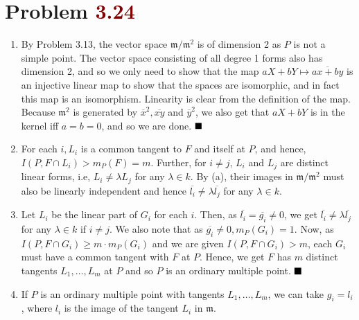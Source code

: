 \documentclass[12pt]{article}
\begin{document}
\section{Problem \textcolor{maroon}{3.24}} %
\begin{enumerate}[label = (\alph*)]
    \item By Problem 3.13, the vector space \( \mathfrak{m}/\mathfrak{m}^2 \) is of dimension 2 as \( P \) is not a simple point. The vector space consisting of all degree 1 forms also has dimension 2, and so we only need to show that the map \( aX+bY \mapsto \overline{ax+by} \) is an injective linear map to show that the spaces are isomorphic, and in fact this map is an isomorphism. Linearity is clear from the definition of the map. Because \( \mathfrak{m}^2 \) is generated by \( \overline{x}^2, \overline{xy} \) and \( \overline{y}^2 \), we also get that \( aX+bY \) is in the kernel iff \( a=b=0 \), and so we are done. \(\hfill \blacksquare\)
          \smallskip

    \item For each \( i, L_i \) is a common tangent to \( F \) and itself at \( P \), and hence, \( I(P, F \cap L_i) > m_P(F) = m \). Further, for \( i \neq j \), \( L_i \) and \( L_j \) are distinct linear forms, i.e, \( L_i \neq \lambda L_j \) for any \( \lambda \in k \). By (a), their images in \( \mathfrak{m}/\mathfrak{m}^2 \) must also be linearly independent and hence \( \overline{l_i} \neq \lambda \overline{l_j} \) for any \( \lambda \in k \).
          \smallskip

    \item Let \( L_i \) be the linear part of \( G_i \) for each \( i \). Then, as \( \overline{l_i} = \overline{g_i} \neq 0 \), we get \( \overline{l_i} \neq \lambda\overline{l_j} \) for any \( \lambda \in k \) if \( i \neq j \). We also note that as \( \overline{g_i} \neq 0, m_P(G_i) = 1 \). Now, as \( I(P, F \cap G_i) \geq m \cdot m_P(G_i) \) and we are given \( I(P, F \cap G_i) > m \), each \( G_i \) must have a common tangent with \( F \) at \( P \). Hence, we get \( F \) has \( m \) distinct tangents \( L_1, \dots, L_m \) at \( P \) and so \( P \) is an ordinary multiple point. \(\hfill \blacksquare\)
          \smallskip

    \item If \( P \) is an ordinary multiple point with tangents \( L_1, \dots, L_m \), we can take \( g_i = l_i \), where \( l_i \) is the image of the tangent \( L_i \) in \( \mathfrak{m} \).
\end{enumerate}
\end{document}
